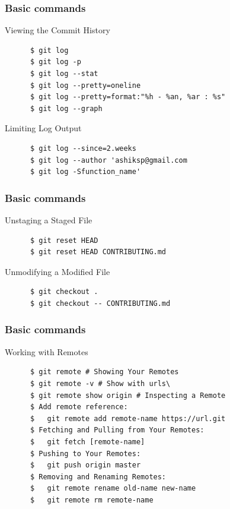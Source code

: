 \documentclass[10pt]{beamer}
\begin{document}
\begin{frame}[fragile]
  \frametitle{Basic commands}
  \begin{block}{Viewing the Commit History}
    \begin{verbatim}
      $ git log
      $ git log -p
      $ git log --stat
      $ git log --pretty=oneline
      $ git log --pretty=format:"%h - %an, %ar : %s"
      $ git log --graph
    \end{verbatim}
  \end{block}
  \pause
  \begin{block}{Limiting Log Output}
    \begin{verbatim}
      $ git log --since=2.weeks
      $ git log --author 'ashiksp@gmail.com
      $ git log -Sfunction_name'
    \end{verbatim}
  \end{block}
\end{frame}

\begin{frame}[fragile]
  \frametitle{Basic commands}
  \begin{block}{Unstaging a Staged File}
    \begin{verbatim}
      $ git reset HEAD
      $ git reset HEAD CONTRIBUTING.md
    \end{verbatim}
  \end{block}
  \pause
  \begin{block}{Unmodifying a Modified File}
    \begin{verbatim}
      $ git checkout .
      $ git checkout -- CONTRIBUTING.md
    \end{verbatim}
  \end{block}
\end{frame}

\begin{frame}[fragile]
  \frametitle{Basic commands}
  \begin{block}{Working with Remotes}
    \begin{verbatim}
      $ git remote # Showing Your Remotes
      $ git remote -v # Show with urls\
      $ git remote show origin # Inspecting a Remote
      $ Add remote reference:
      $   git remote add remote-name https://url.git
      $ Fetching and Pulling from Your Remotes:
      $   git fetch [remote-name]
      $ Pushing to Your Remotes:
      $   git push origin master
      $ Removing and Renaming Remotes:
      $   git remote rename old-name new-name
      $   git remote rm remote-name
    \end{verbatim}
  \end{block}
\end{frame}
\end{document}
